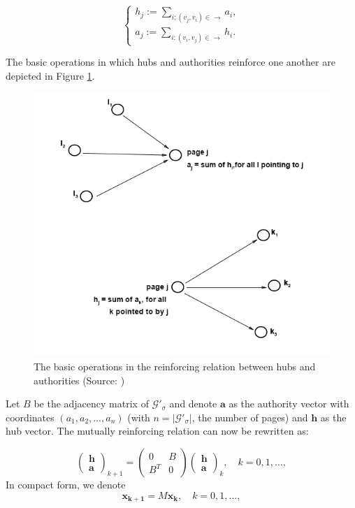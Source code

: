\documentclass[a4paper,11pt]{report}
\newcommand{\graf}{\mathscr{G}}
\begin{document}
$$\begin{cases} h_j := \sum_{i:(v_j,v_i)\in \to} a_i,\\ 
a_j := \sum_{i:(v_i,v_j)\in \to} h_i.
\end{cases}$$ 

The basic operations in which hubs and authorities reinforce one another are 
depicted in Figure \ref{reinforcing}.

\begin{figure}[h!]
  \centering
  \includegraphics[scale=0.6]{basic.png}\caption{The basic operations in the reinforcing relation between hubs and authorities (Source: \cite{kleinberg})}\label{reinforcing}
\end{figure}

Let $B$ be the adjacency matrix of $\graf'_\sigma$ and denote $\mathbf{a}$ as the authority vector with coordinates $(a_1,a_2,\ldots,a_n)$ (with $n = 
 |\graf'_\sigma|$, the number of pages) and $\mathbf{h}$ as the hub vector. The mutually reinforcing relation can now be rewritten 
as:

$$\begin{pmatrix} 
\textbf{h}\\
\textbf{a}
\end{pmatrix}_{k+1} = \begin{pmatrix} 
0 & B\\
B^T & 0
\end{pmatrix} \begin{pmatrix} 
\textbf{h}\\
\textbf{a}
\end{pmatrix}_{k},\quad k = 0, 1,\ldots,$$
In compact form, we denote
$$\mathbf{x_{k+1}} = M\mathbf{x_k},\quad k = 0, 1,\ldots,$$
\end{document}
